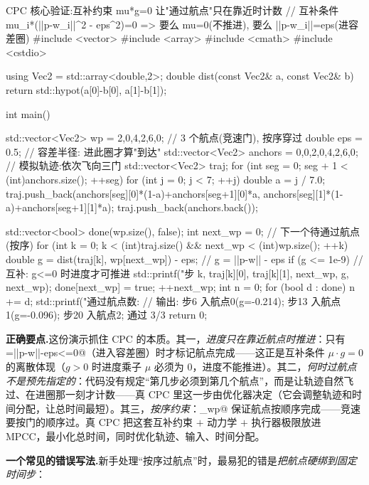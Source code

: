 \begin{codebox}[C++]{CPC 核心验证:互补约束 mu*g=0 让"通过航点"只在靠近时计数}
// 互补条件 mu_i*(||p-w_i||^2 - eps^2)=0 => 要么 mu=0(不推进), 要么 ||p-w_i||=eps(进容差圈)
#include <vector>
#include <array>
#include <cmath>
#include <cstdio>

using Vec2 = std::array<double,2>;
double dist(const Vec2& a, const Vec2& b){ return std::hypot(a[0]-b[0], a[1]-b[1]); }

int main() {
  std::vector<Vec2> wp = {{2,0},{4,2},{6,0}};      // 3 个航点(竞速门), 按序穿过
  double eps = 0.5;                                // 容差半径: 进此圈才算"到达"
  std::vector<Vec2> anchors = {{0,0},{2,0},{4,2},{6,0}};  // 模拟轨迹:依次飞向三门
  std::vector<Vec2> traj;
  for (int seg = 0; seg + 1 < (int)anchors.size(); ++seg)
    for (int j = 0; j < 7; ++j) {
      double a = j / 7.0;
      traj.push_back({anchors[seg][0]*(1-a)+anchors[seg+1][0]*a,
                      anchors[seg][1]*(1-a)+anchors[seg+1][1]*a});
    }
  traj.push_back(anchors.back());

  std::vector<bool> done(wp.size(), false);
  int next_wp = 0;                                 // 下一个待通过航点(按序)
  for (int k = 0; k < (int)traj.size() && next_wp < (int)wp.size(); ++k) {
    double g = dist(traj[k], wp[next_wp]) - eps;   // g = ||p-w|| - eps
    if (g <= 1e-9) {                               // 互补: g<=0 时进度才可推进
      std::printf("步%
                  k, traj[k][0], traj[k][1], next_wp, g, next_wp);
      done[next_wp] = true; ++next_wp;
    }
  }
  int n = 0; for (bool d : done) n += d;
  std::printf("通过航点数: %
  // 输出: 步6 入航点0(g=-0.214); 步13 入航点1(g=-0.096); 步20 入航点2; 通过 3/3
  return 0;
}
\end{codebox}

\noindent\textbf{正确要点.}\;这份演示抓住 CPC 的本质。其一，\emph{进度只在靠近航点时推进}：只有 \verb@g=||p-w||-eps<=0@（进入容差圈）时才标记航点完成——这正是互补条件 $\mu\cdot g=0$ 的离散体现（$g>0$ 时进度乘子 $\mu$ 必须为 $0$，进度不能推进）。其二，\emph{何时过航点不是预先指定的}：代码没有规定“第几步必须到第几个航点”，而是让轨迹自然飞过、在进圈那一刻才计数——真 CPC 里这一步由优化器决定（它会调整轨迹和时间分配，让总时间最短）。其三，\emph{按序约束}：\verb@next_wp@ 保证航点按顺序完成——竞速要按门的顺序过。真 CPC 把这套互补约束 $+$ 动力学 $+$ 执行器极限放进 MPCC，最小化总时间，同时优化轨迹、输入、时间分配。

\noindent{}\textbf{一个常见的错误写法.}\;新手处理“按序过航点”时，最易犯的错是\emph{把航点硬绑到固定时间步}：

